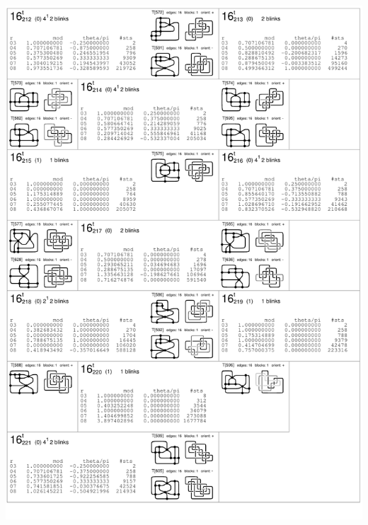 \begin{center}
 \includegraphics[height=23.5cm]{E.figsbw2/con3catalog036_bw.pdf} \eject  

\end{center}
